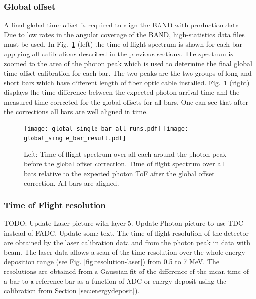 \documentclass[3p,final,twocolumn]{elsarticle}
\begin{document}
\subsubsection{Global offset}
\label{sec:global_offset}
A final global time offset is required to align the BAND with production data. Due to low rates in the angular coverage of the BAND, 
high-statistics data files must be used. 
In Fig.~\ref{fig:final_offset} (left) the time of flight spectrum is shown for each bar applying all calibrations described in the previous sections. The spectrum is zoomed to the area of the photon peak which is used to determine the final global time offset calibration for each bar. The two peaks are the two groups of long and short bars which have different length of fiber optic cable installed. Fig.~\ref{fig:final_offset} (right) displays the time difference between the expected photon arrival time and the measured time corrected for the global offsets for all bars. One can see that after the corrections all bars are well aligned in time.
\begin{figure}[tb]
	\centering
		\texttt{[image: global\_single\_bar\_all\_runs.pdf]}
		\texttt{[image: global\_single\_bar\_result.pdf]}
	\caption{Left: Time of flight spectrum over all each around the photon peak before the global offset correction. Time of flight spectrum over all bars relative to the expected photon ToF after  the global offset correction. All bars are aligned.}
	\label{fig:final_offset}
\end{figure}

\subsubsection{Time of Flight resolution}
\label{sec:tofresolution}

{\color{red} TODO: Update Laser picture with layer 5. Update Photon picture to use TDC instead of FADC. Update some text.}
The time-of-flight resolution of the detector are obtained by the laser calibration data and from the photon peak in data with beam. The laser data allows a scan of the time resolution over the whole energy deposition range (see Fig. \ref{fig:resolution-laser}) from 0.5 to 7 \si{\mega\electronvolt}. The resolutions are obtained from a Gaussian fit of the difference of the mean time of a bar to a reference bar as a function of ADC or energy deposit using the calibration from Section \ref{sec:energydeposit}).
\end{document}
